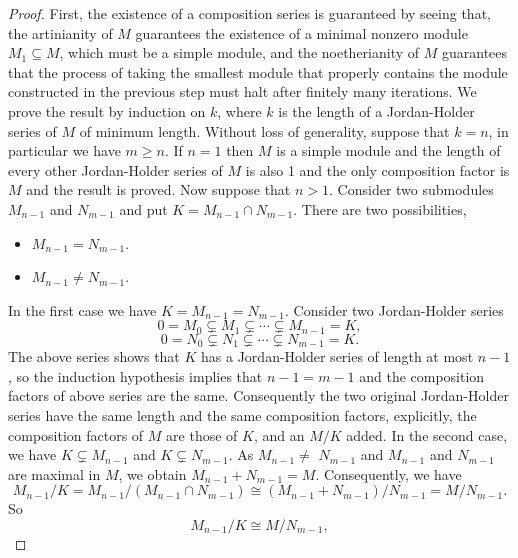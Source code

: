 \documentclass[12pt,a4paper]{report}
\theoremstyle{definition}
\theoremstyle{remark}
\theoremstyle{definition}
\begin{document}
\begin{proof}
    First, the existence of a composition series is guaranteed by seeing that, the artinianity of $M$ guarantees the existence of a minimal nonzero module $M_1\subseteq M$, which must be a simple module, and the noetherianity of $M$ guarantees that the process of taking the smallest module that properly contains the module constructed in the previous step must halt after finitely many iterations.\smallbreak
  We prove the result by induction on $k$, where $k$ is the length of a Jordan-Holder series of $M$ of minimum length. Without loss of generality, suppose that $k = n$, in particular we have $m \geq n$. If $n=1$ then $M$ is a simple module and the length of every other Jordan-Holder series of $M$ is also 1 and the only composition factor is $M$ and the result is proved.\smallbreak
Now suppose that $n>1$. Consider two submodules $M_{n-1}$ and $N_{m-1}$ and put $K=M_{n-1} \cap N_{m-1}$. There are two possibilities,
\begin{itemize}
    \item[(i)] $M_{n-1}=N_{m-1}$.
    \item[(ii)] $M_{n-1} \neq N_{m-1}$.
\end{itemize}
In the first case we have $K=M_{n-1}=N_{m-1}$. Consider two Jordan-Holder series
\begin{equation*}
0=M_{0} \subsetneq M_{1} \subsetneq \cdots \subsetneq M_{n-1}=K,
\end{equation*}
\begin{equation*}
0=N_{0} \subsetneq N_{1} \subsetneq \cdots \subsetneq N_{m-1}=K.
\end{equation*}
The above series shows that $K$ has a Jordan-Holder series of length at most $ n-1$, so the induction hypothesis implies that $n-1=m-1$ and the composition factors of above series are the same. Consequently the two original Jordan-Holder series have the same length and the same composition factors, explicitly, the composition factors of $M$ are those of $K$, and an $M/K$ added.\smallbreak
In the second case, we have $K \subsetneq M_{n-1}$ and $K \subsetneq N_{m-1}$. As $M_{n-1} \neq$ $N_{m-1}$ and $M_{n-1}$ and $N_{m-1}$ are maximal in $M$, we obtain $M_{n-1}+N_{m-1}=M$. Consequently, we have
\begin{equation*}
M_{n-1} / K=M_{n-1} /\left(M_{n-1} \cap N_{m-1}\right) \cong\left(M_{n-1}+N_{m-1}\right) / N_{m-1}=M / N_{m-1}.
\end{equation*}
So
\begin{equation*}
M_{n-1} / K \cong M / N_{m-1},

\end{equation*}
\end{proof}
\end{document}
